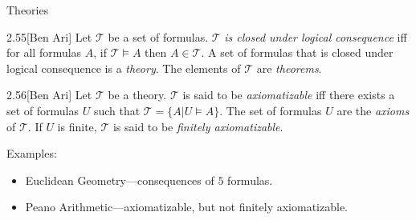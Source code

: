 \documentclass[style=sailor,size=12pt]{powerdot}
\begin{document}
\begin{wideslide}[bm=,toc=]{Theories}
\begin{defn}{2.55}[Ben Ari]
Let $\mathcal{T}$ be a set of formulas. $\mathcal{T}$ \emph{is closed under
logical consequence} iff for all formulas $A$, if $\mathcal{T} \models A$ then
$A \in \mathcal{T}$. A set of formulas that is closed under logical consequence
is a \emph{theory}. The elements of $\mathcal{T}$ are \emph{theorems}.
\end{defn}
\begin{defn}{2.56}[Ben Ari]
Let $\mathcal{T}$ be a theory. $\mathcal{T}$ is said to be \emph{axiomatizable} 
iff there exists a set of formulas $U$ such that  $\mathcal{T} = \{A | U \models
A\}$. The set of formulas $U$ are the \emph{axioms} of $\mathcal{T}$. If $U$ is
finite, $\mathcal{T}$ is said to be \emph{finitely axiomatizable}.
\end{defn}
Examples:
\begin{itemize}
\item Euclidean Geometry---consequences of $5$ formulas.
\item Peano Arithmetic---axiomatizable, but not finitely axiomatizable.
\end{itemize}


\end{wideslide}
\end{document}
